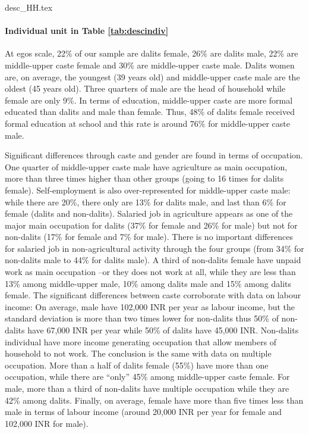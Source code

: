 \documentclass[a4paper, 11pt, onecolumn]{article}
\begin{document}
{desc_HH.tex}

\paragraph{Individual unit in Table \ref{tab:descindiv}}
At egos scale, 22\% of our sample are dalits female, 26\% are dalits male, 22\% are middle-upper caste female and 30\% are middle-upper caste male.
Dalits women are, on average, the youngest (39 years old) and middle-upper caste male are the oldest (45 years old).
Three quarters of male are the head of household while female are only 9\%.
In terms of education, middle-upper caste are more formal educated than dalits and male than female.
Thus, 48\% of dalits female received formal education at school and this rate is around 76\% for middle-upper caste male.

Significant differences through caste and gender are found in terms of occupation.
One quarter of middle-upper caste male have agriculture as main occupation, more than three times higher than other groups (going to 16 times for dalits female).
Self-employment is also over-represented for middle-upper caste male: while there are 20\%, there only are 13\% for dalits male, and last than 6\% for female (dalits and non-dalits).
Salaried job in agriculture appears as one of the major main occupation for dalits (37\% for female and 26\% for male) but not for non-dalits (17\% for female and 7\% for male).
There is no important differences for salaried job in non-agricultural activity through the four groups (from 34\% for non-dalits male to 44\% for dalits male).
A third of non-dalits female have unpaid work as main occupation --or they does not work at all, while they are less than 13\% among middle-upper male, 10\% among dalits male and 15\% among dalits female.
The significant differences between caste corroborate with data on labour income:
On average, male have 102,000 INR per year as labour income, but the standard deviation is more than two times lower for non-dalits thus 50\% of non-dalits have 67,000 INR per year while 50\% of dalits have 45,000 INR.
Non-dalits individual have more income generating occupation that allow members of household to not work. 
The conclusion is the same with data on multiple occupation.
More than a half of dalits female (55\%) have more than one occupation, while there are ``only'' 45\% among middle-upper caste female.
For male, more than a third of non-dalits have multiple occupation while they are 42\% among dalits.
Finally, on average, female have more than five times less than male in terms of labour income (around 20,000 INR per year for female and 102,000 INR for male).
\end{document}

